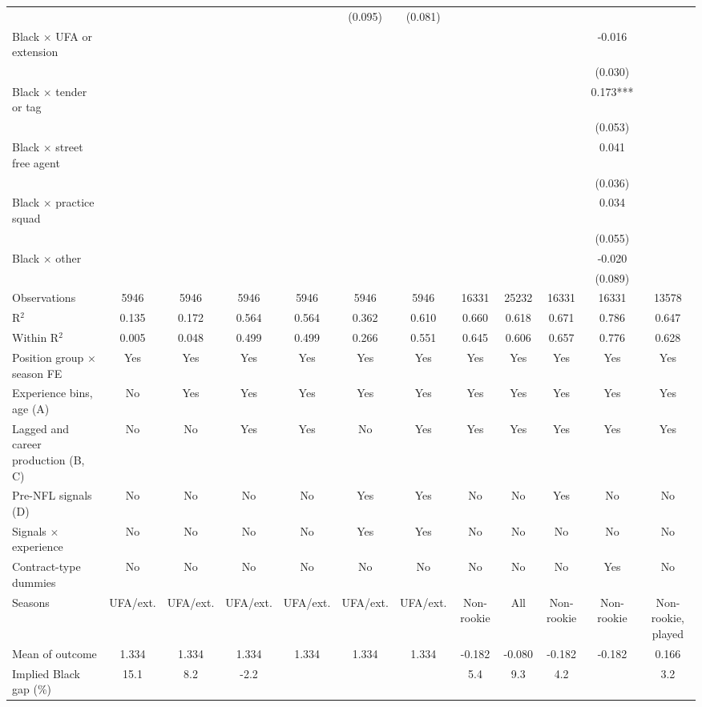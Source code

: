 \begin{table}[!h]
{\begin{threeparttable}
\begin{tabular}[t]{lccccccccccc}
 &  &  &  &  & (0.095) & (0.081) &  &  &  &  & \\
Black $\times$ UFA or extension &  &  &  &  &  &  &  &  &  & -0.016 & \\
 &  &  &  &  &  &  &  &  &  & (0.030) & \\
Black $\times$ tender or tag &  &  &  &  &  &  &  &  &  & 0.173*** & \\
 &  &  &  &  &  &  &  &  &  & (0.053) & \\
Black $\times$ street free agent &  &  &  &  &  &  &  &  &  & 0.041 & \\
 &  &  &  &  &  &  &  &  &  & (0.036) & \\
Black $\times$ practice squad &  &  &  &  &  &  &  &  &  & 0.034 & \\
 &  &  &  &  &  &  &  &  &  & (0.055) & \\
Black $\times$ other &  &  &  &  &  &  &  &  &  & -0.020 & \\
 &  &  &  &  &  &  &  &  &  & (0.089) & \\
\midrule
Observations & 5946 & 5946 & 5946 & 5946 & 5946 & 5946 & 16331 & 25232 & 16331 & 16331 & 13578\\
R$^2$ & 0.135 & 0.172 & 0.564 & 0.564 & 0.362 & 0.610 & 0.660 & 0.618 & 0.671 & 0.786 & 0.647\\
Within R$^2$ & 0.005 & 0.048 & 0.499 & 0.499 & 0.266 & 0.551 & 0.645 & 0.606 & 0.657 & 0.776 & 0.628\\
Position group $\times$ season FE & Yes & Yes & Yes & Yes & Yes & Yes & Yes & Yes & Yes & Yes & Yes\\
Experience bins, age (A) & No & Yes & Yes & Yes & Yes & Yes & Yes & Yes & Yes & Yes & Yes\\
Lagged and career production (B, C) & No & No & Yes & Yes & No & Yes & Yes & Yes & Yes & Yes & Yes\\
Pre-NFL signals (D) & No & No & No & No & Yes & Yes & No & No & Yes & No & No\\
Signals $\times$ experience & No & No & No & No & Yes & Yes & No & No & No & No & No\\
Contract-type dummies & No & No & No & No & No & No & No & No & No & Yes & No\\
Seasons & UFA/ext. & UFA/ext. & UFA/ext. & UFA/ext. & UFA/ext. & UFA/ext. & Non-rookie & All & Non-rookie & Non-rookie & Non-rookie, played\\
Mean of outcome & 1.334 & 1.334 & 1.334 & 1.334 & 1.334 & 1.334 & -0.182 & -0.080 & -0.182 & -0.182 & 0.166\\
Implied Black gap (\%) & 15.1 & 8.2 & -2.2 &  &  &  & 5.4 & 9.3 & 4.2 &  & 3.2\\

\end{tabular}
\end{threeparttable}}
\end{table}
